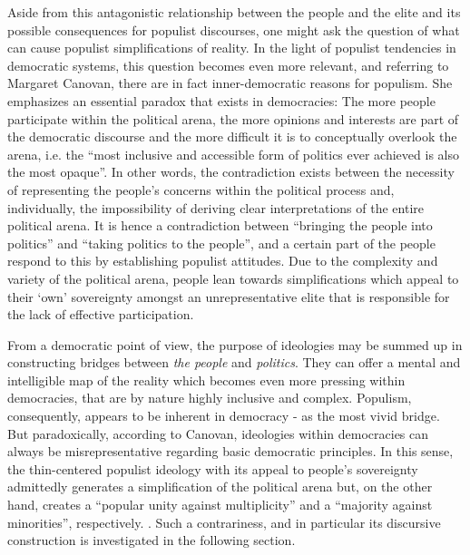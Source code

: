 \documentclass[a4paper]{scrreprt}
\begin{document}
Aside from this antagonistic relationship between the people and the elite and its possible consequences for populist discourses, one might ask the question of what can cause populist simplifications of reality. In the light of populist tendencies in democratic systems, this question becomes even more relevant, and referring to Margaret Canovan, there are in fact inner-democratic reasons for populism. She emphasizes an essential paradox that exists in democracies: The more people participate within the political arena, the more opinions and interests are part of the democratic discourse and the more difficult it is to conceptually overlook the arena, i.e. the ``most inclusive and accessible form of politics ever achieved is also the most opaque''. \cite[p.~25]{canovan:2002} In other words, the contradiction exists between the necessity of representing the people's concerns within the political process and, individually, the impossibility of deriving clear interpretations of the entire political arena. It is hence a contradiction between ``bringing the people into politics'' and ``taking politics to the people'', and a certain part of the people respond to this by establishing populist attitudes. \cite[p.~26]{canovan:2002} Due to the complexity and variety of the political arena, people lean towards simplifications which appeal to their `own' sovereignty amongst an unrepresentative elite that is responsible for the lack of effective participation.\par
From a democratic point of view, the purpose of ideologies may be summed up in constructing bridges between {\em the people} and {\em politics}. They can offer a mental and intelligible map of the reality which becomes even more pressing within democracies, that are by nature highly inclusive and complex. Populism, consequently, appears to be inherent in democracy - as the most vivid bridge. But paradoxically, according to Canovan, ideologies within democracies can always be misrepresentative regarding basic democratic principles. In this sense, the thin-centered populist ideology with its appeal to people’s sovereignty admittedly generates a simplification of the political arena but, on the other hand, creates a ``popular unity against multiplicity'' and a ``majority against minorities'', respectively. \cite[p.~26]{canovan:2002}. Such a contrariness, and in particular its discursive construction is investigated in the following section.
\end{document}
